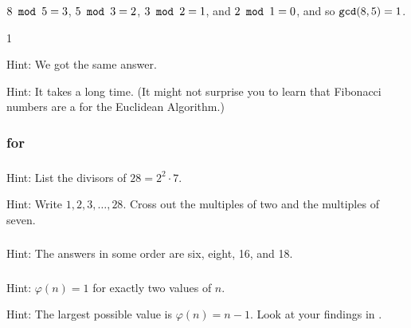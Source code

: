 \subsubsection*{ \answers}
\begin{apart}
    \item $8 \texttt{ mod } 5 = 3$, $5 \texttt{ mod } 3 = 2$, $3 \texttt{ mod } 2 = 1$, and $2 \texttt{ mod } 1 = 0$, and so $\texttt{gcd}(8,5)=1$.
    \item 1
    \item Hint: We got the same answer.
    \item Hint: It takes a long time.  (It might not surprise you to learn that Fibonacci numbers are a  for the Euclidean Algorithm.)
\end{apart}

\subsubsection{\answers for  \subcoprime}

\subsubsection*{ \answers}
\begin{apart}
    \item Hint: List the divisors of $28 = 2^2 \cdot 7$.
    \item Hint: Write $1,2,3,\ldots,28$. Cross out the multiples of two and the multiples of seven.
\end{apart}

\subsubsection*{ \answers}
    Hint: The answers in some order are six, eight, 16, and 18.

\subsubsection*{ \answers}
\begin{apart}
    \item Hint: $\varphi(n)=1$ for exactly two values of $n$.
    \item Hint: The largest possible value is $\varphi(n)=n-1$.  Look at your findings in .
\end{apart}


